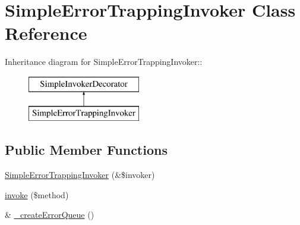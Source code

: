 \hypertarget{class_simple_error_trapping_invoker}{
\section{SimpleErrorTrappingInvoker Class Reference}
\label{class_simple_error_trapping_invoker}
}
Inheritance diagram for SimpleErrorTrappingInvoker::\begin{figure}[H]
\begin{center}
\leavevmode
\includegraphics[height=2cm]{class_simple_error_trapping_invoker}
\end{center}
\end{figure}
\subsection*{Public Member Functions}
\begin{DoxyCompactItemize}
\item 
\hyperlink{class_simple_error_trapping_invoker_af403fe699963304b0d95f4bc1366d6b8}{SimpleErrorTrappingInvoker} (\&\$invoker)
\item 
\hyperlink{class_simple_error_trapping_invoker_ad9122507df8d27c3b7ab8fd1ecb53e45}{invoke} (\$method)
\item 
\& \hyperlink{class_simple_error_trapping_invoker_a721fa4b7d6c984e87648c5d3b08e35e1}{\_\-createErrorQueue} ()
\end{DoxyCompactItemize}


